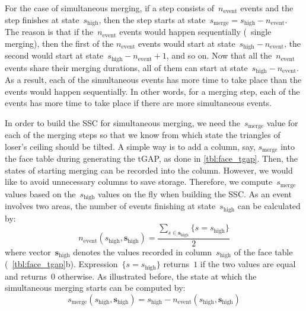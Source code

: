 \documentclass[twocolumn]{svjour3}          %
\begin{document}
For the case of simultaneous merging,
if a step consists of~$n_\mathrm{event}$ events and 
the step finishes at state~$s_\mathrm{high}$, then the step starts 
at state~$s_\mathrm{merge}=s_\mathrm{high} - n_\mathrm{event}$.
The reason is that if the~$n_\mathrm{event}$ events 
would happen sequentially (\ie~single merging),
then the first of the $n_\mathrm{event}$ events would start at
state~$s_\mathrm{high} - n_\mathrm{event}$,
the second would start at
state~$s_\mathrm{high} - n_\mathrm{event} + 1$, and so on.
Now that all the~$n_\mathrm{event}$ events share their merging durations,
all of them can start at state~$s_\mathrm{high} - n_\mathrm{event}$.
As a result,
each of the simultaneous events has more time to take place
than the events would happen sequentially.
In other words, for a merging step,
each of the events has more time to take place 
if there are more simultaneous events.

In order to build the SSC for simultaneous merging,
we need the~$s_\mathrm{merge}$ value for each of the merging steps
so that we know from which state 
the triangles of loser's ceiling should be tilted.
A simple way is to add a column, say, $s_\mathrm{merge}$
into the face table during generating the tGAP, 
as done in \tabl\ref{tbl:face_tgap}.
Then, the states of starting merging can be recorded into the column.
However, we would like to avoid unnecessary columns to save storage.
Therefore, we compute~$s_\mathrm{merge}$ values 
based on the~$s_\mathrm{high}$ values
on the fly when building the SSC.
As an event involves two areas,
the number of events finishing at state~$s_\mathrm{high}$ 
can be calculated by:
\begin{equation}
\label{eq:n_event_state}
n_\mathrm{event} (s_\mathrm{high}, \mathrm{\textbf{s}_{high}}) = 
\frac{\sum\limits_{s \in \mathrm{\textbf{s}_{high}}} \{s=s_\mathrm{high}\}}{2}
\end{equation}
where vector~$\mathrm{\textbf{s}_{high}}$ 
denotes the values
recorded in column~$s_\mathrm{high}$ of the face table
(\eg~\tabl\ref{tbl:face_tgap}b).
Expression~$\{s=s_\mathrm{high}\}$ returns~$1$ if the two values are equal 
and returns~$0$ otherwise.
As illustrated before, the state at which the simultaneous merging starts 
can be computed by:
\begin{equation}
\label{eq:s_merge_state}
s_\mathrm{merge} (s_\mathrm{high}, \mathrm{\textbf{s}_{high}}) = 
    s_\mathrm{high} - 
    n_\mathrm{event} (s_\mathrm{high}, \mathrm{\textbf{s}_{high}})
\end{equation}
\end{document}

